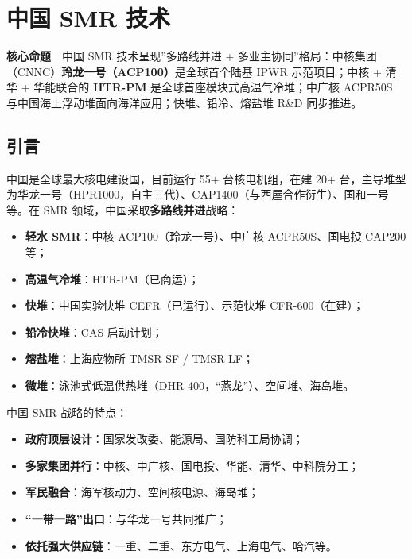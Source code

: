 \documentclass[
  UTF8,
  scheme=plain,
  fontsize=10pt,
  openany
]{ctexbook}
\begin{document}
\cleardoublepage

\chapter{中国 SMR 技术}\label{ux4e2dux56fd-smr-ux6280ux672f}

\begin{epigraph}

\textbf{核心命题}　中国 SMR 技术呈现''多路线并进 +
多业主协同''格局：中核集团（CNNC）\textbf{玲龙一号（ACP100）}是全球首个陆基
IPWR 示范项目；中核 + 清华 + 华能联合的 \textbf{HTR-PM}
是全球首座模块式高温气冷堆；中广核 ACPR50S
与中国海上浮动堆面向海洋应用；快堆、铅冷、熔盐堆 R\&D 同步推进。

\end{epigraph}

\section{引言}\label{ux5f15ux8a00-17}

中国是全球最大核电建设国，目前运行 55+ 台核电机组，在建 20+
台，主导堆型为华龙一号（HPR1000，自主三代）、CAP1400（与西屋合作衍生）、国和一号等。在
SMR 领域，中国采取\textbf{多路线并进}战略：

\begin{itemize}
\tightlist
\item
  \textbf{轻水 SMR}：中核 ACP100（玲龙一号）、中广核 ACPR50S、国电投
  CAP200 等；
\item
  \textbf{高温气冷堆}：HTR-PM（已商运）；
\item
  \textbf{快堆}：中国实验快堆 CEFR（已运行）、示范快堆 CFR-600（在建）；
\item
  \textbf{铅冷快堆}：CAS 启动计划；
\item
  \textbf{熔盐堆}：上海应物所 TMSR-SF / TMSR-LF；
\item
  \textbf{微堆}：泳池式低温供热堆（DHR-400，``燕龙''）、空间堆、海岛堆。
\end{itemize}

中国 SMR 战略的特点：

\begin{itemize}
\tightlist
\item
  \textbf{政府顶层设计}：国家发改委、能源局、国防科工局协调；
\item
  \textbf{多家集团并行}：中核、中广核、国电投、华能、清华、中科院分工；
\item
  \textbf{军民融合}：海军核动力、空间核电源、海岛堆；
\item
  \textbf{``一带一路''出口}：与华龙一号共同推广；
\item
  \textbf{依托强大供应链}：一重、二重、东方电气、上海电气、哈汽等。
\end{itemize}
\end{document}
